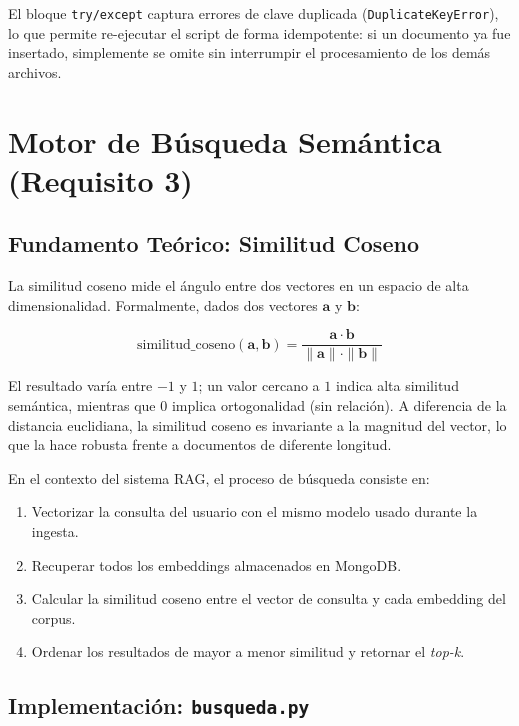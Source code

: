 \documentclass[12pt,a4paper]{article}
\begin{document}
El bloque \texttt{try/except} captura errores de clave duplicada (\texttt{DuplicateKeyError}), lo que permite re-ejecutar el script de forma idempotente: si un documento ya fue insertado, simplemente se omite sin interrumpir el procesamiento de los demás archivos.

\section{Motor de Búsqueda Semántica (Requisito 3)}

\subsection{Fundamento Teórico: Similitud Coseno}

La similitud coseno mide el ángulo entre dos vectores en un espacio de alta dimensionalidad. Formalmente, dados dos vectores $\mathbf{a}$ y $\mathbf{b}$:

\[
\text{similitud\_coseno}(\mathbf{a}, \mathbf{b}) = \frac{\mathbf{a} \cdot \mathbf{b}}{\|\mathbf{a}\| \cdot \|\mathbf{b}\|}
\]

El resultado varía entre $-1$ y $1$; un valor cercano a $1$ indica alta similitud semántica, mientras que $0$ implica ortogonalidad (sin relación). A diferencia de la distancia euclidiana, la similitud coseno es invariante a la magnitud del vector, lo que la hace robusta frente a documentos de diferente longitud.

En el contexto del sistema RAG, el proceso de búsqueda consiste en:
\begin{enumerate}
    \item Vectorizar la consulta del usuario con el mismo modelo usado durante la ingesta.
    \item Recuperar todos los embeddings almacenados en MongoDB.
    \item Calcular la similitud coseno entre el vector de consulta y cada embedding del corpus.
    \item Ordenar los resultados de mayor a menor similitud y retornar el \textit{top-k}.
\end{enumerate}

\subsection{Implementación: \texttt{busqueda.py}}
\end{document}
